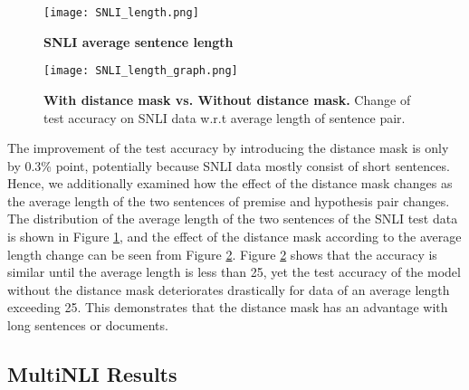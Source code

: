 \documentclass[11pt,letterpaper]{article}
\begin{document}
\begin{figure}[!h]
\begin{center}
	\texttt{[image: SNLI\_length.png]}    
\caption{\textbf{SNLI average sentence length}}
\label{snli_length}
\end{center}
\end{figure}

\begin{figure}[!h]
\begin{center}
	\texttt{[image: SNLI\_length\_graph.png]}    
\caption{\textbf{With distance mask vs. Without distance mask.} Change of test accuracy on SNLI data w.r.t average length of sentence pair.}
\label{snli_length_graph}
\end{center}
\end{figure}

The improvement of the test accuracy by introducing the distance mask is only by 0.3\% point, potentially because SNLI data mostly consist of short sentences. Hence, we additionally examined how the effect of the distance mask changes as the average length of the two sentences of premise and hypothesis pair changes. The distribution of the average length of the two sentences of the SNLI test data is shown in Figure \ref{snli_length}, and the effect of the distance mask according to the average length change can be seen from Figure \ref{snli_length_graph}. Figure \ref{snli_length_graph} shows that the accuracy is similar until the average length is less than 25, yet the test accuracy of the model without the distance mask deteriorates drastically for data of an average length exceeding 25. This demonstrates that the distance mask has an advantage with long sentences or documents.

\subsection{MultiNLI Results}
\end{document}
